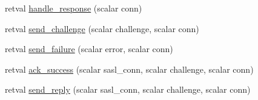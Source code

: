 \begin{Indent}
\begin{DoxyCompactItemize}
\item 
retval \hyperlink{class_d_jabberd_1_1_stanza_1_1_s_a_s_l_acc22c02d77a797fa49302d443c2b7e8c}{handle\-\_\-response} (scalar conn)
\item 
retval \hyperlink{class_d_jabberd_1_1_stanza_1_1_s_a_s_l_a58279852e2fea3cfacdb2e814aa95bad}{send\-\_\-challenge} (scalar challenge, scalar conn)
\item 
retval \hyperlink{class_d_jabberd_1_1_stanza_1_1_s_a_s_l_aba85f62d7b6dd418af01768fa02d4280}{send\-\_\-failure} (scalar error, scalar conn)
\item 
retval \hyperlink{class_d_jabberd_1_1_stanza_1_1_s_a_s_l_a3034a730454c1970ba87900edd249c77}{ack\-\_\-success} (scalar sasl\-\_\-conn, scalar challenge, scalar conn)
\item 
retval \hyperlink{class_d_jabberd_1_1_stanza_1_1_s_a_s_l_a9b1dacfc7d5cddad72c413fe83f859ea}{send\-\_\-reply} (scalar sasl\-\_\-conn, scalar challenge, scalar conn)
\end{DoxyCompactItemize}
\end{Indent}


